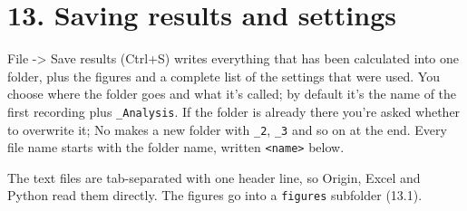 \documentclass[
  11pt,
  a4paper,
]{article}
\begin{document}
\hypertarget{saving-results-and-settings}{%
\section{13. Saving results and
settings}\label{saving-results-and-settings}}

File -\textgreater{} Save results (Ctrl+S) writes everything that has
been calculated into one folder, plus the figures and a complete list of
the settings that were used. You choose where the folder goes and what
it's called; by default it's the name of the first recording plus
\texttt{\_\allowbreak{}Analysis}. If the folder is already there you're
asked whether to overwrite it; No makes a new folder with
\texttt{\_\allowbreak{}2}, \texttt{\_\allowbreak{}3} and so on at the
end. Every file name starts with the folder name, written
\texttt{\textless{}name\textgreater{}} below.

The text files are tab-separated with one header line, so Origin, Excel
and Python read them directly. The figures go into a \texttt{figures}
subfolder (13.1).
\end{document}
